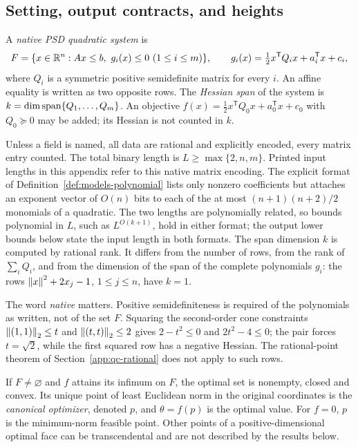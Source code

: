 \subsection{Setting, output contracts, and heights}
\label{app:qc-setting}

\begin{definition}
\label{def:qc-native}
A \emph{native PSD quadratic system} is
\begin{equation}
\label{eq:qc-system}
F=\{x\in\mathbb R^n: Ax\le b,\ g_i(x)\le0\ (1\le i\le m)\},\qquad
g_i(x)=\tfrac12x^{\mathsf T}Q_ix+a_i^{\mathsf T}x+c_i,
\end{equation}
where $Q_i$ is a symmetric positive semidefinite matrix for every $i$. An
affine equality is written as two opposite rows. The \emph{Hessian span} of
the system is $k=\dim\operatorname{span}\{Q_1,\ldots,Q_m\}$. An objective
$f(x)=\tfrac12x^{\mathsf T}Q_0x+a_0^{\mathsf T}x+c_0$ with $Q_0\succeq0$ may
be added; its Hessian is not counted in $k$.
\end{definition}

Unless a field is named, all data are rational and explicitly encoded, every
matrix entry counted. The total binary length is $L\ge\max\{2,n,m\}$. Printed
input lengths in this appendix refer to this native matrix encoding. The
explicit format of Definition~\ref{def:models-polynomial} lists only nonzero
coefficients but attaches an exponent vector of $O(n)$ bits to each of the at
most $(n+1)(n+2)/2$ monomials of a quadratic. The two lengths are
polynomially related, so bounds polynomial in $L$, such as $L^{O(k+1)}$, hold
in either format; the output lower bounds below state the input length in
both formats. The span dimension $k$ is computed by rational rank. It
differs from the number of rows, from the rank of $\sum_iQ_i$, and from the
dimension of the span of the complete polynomials $g_i$: the rows
$\left\lVert x\right\rVert^2+2x_j-1$, $1\le j\le n$, have $k=1$.

The word \emph{native} matters. Positive semidefiniteness is required of the
polynomials as written, not of the set $F$. Squaring the second-order cone
constraints $\left\lVert(1,1)\right\rVert_2\le t$ and $\left\lVert(t,t)\right\rVert_2\le2$ gives
$2-t^2\le0$ and $2t^2-4\le0$; the pair forces $t=\sqrt2$, while the first
squared row has a negative Hessian. The rational-point theorem of
Section~\ref{app:qc-rational} does not apply to such rows.

If $F\ne\varnothing$ and $f$ attains its infimum on $F$, the optimal set is
nonempty, closed and convex. Its unique point of least Euclidean norm in the
original coordinates is the \emph{canonical optimizer}, denoted $p$, and
$\theta=f(p)$ is the optimal value. For $f=0$, $p$ is the minimum-norm
feasible point. Other points of a positive-dimensional optimal face can be
transcendental and are not described by the results below.

